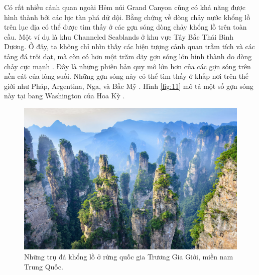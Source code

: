 \documentclass[10pt,twocolumn,letterpaper]{article}
\begin{document}
Có rất nhiều cảnh quan ngoài Hẻm núi Grand Canyon cũng có khả năng được hình thành bởi các lực tàn phá dữ dội. Bằng chứng về dòng chảy nước khổng lồ trên lục địa có thể được tìm thấy ở các gợn sóng dòng chảy khổng lồ trên toàn cầu. Một ví dụ là khu Channeled Scablands ở khu vực Tây Bắc Thái Bình Dương. Ở đây, ta không chỉ nhìn thấy các hiện tượng cảnh quan trầm tích và các tảng đá trôi dạt, mà còn có hơn một trăm dãy gợn sóng lớn hình thành do dòng chảy cực mạnh \cite{78,79}. Đây là những phiên bản quy mô lớn hơn của các gợn sóng trên nền cát của lòng suối. Những gợn sóng này có thể tìm thấy ở khắp nơi trên thế giới như Pháp, Argentina, Nga, và Bắc Mỹ \cite{81}. Hình \ref{fig:11} mô tả một số gợn sóng này tại bang Washington của Hoa Kỳ \cite{80}.
\begin{figure}[b]
\begin{center}
   \includegraphics[width=1\linewidth]{zhangjiajie.jpg}
\end{center}
   \caption{Những trụ đá khổng lồ ở rừng quốc gia Trương Gia Giới, miền nam Trung Quốc.}
\label{fig:12}
\label{fig:onecol}
\end{figure}
\end{document}
